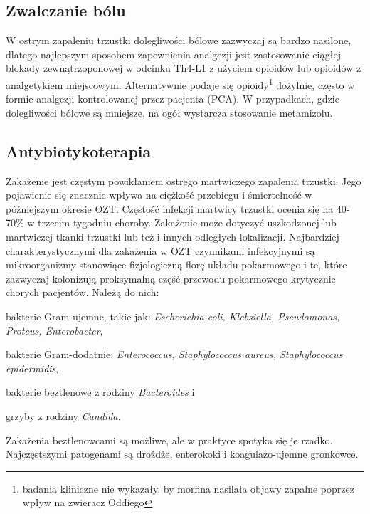 \documentclass[a4paper, 12pt]{report}
\begin{document}
\subsection{Zwalczanie bólu}

W ostrym zapaleniu trzustki dolegliwości bólowe zazwyczaj są bardzo
nasilone, dlatego najlepszym sposobem zapewnienia analgezji jest
zastosowanie ciągłej blokady zewnątrzoponowej w odcinku Th4-L1 z
użyciem opioidów lub opioidów z analgetykiem miejscowym. Alternatywnie
podaje się opioidy\footnote{badania kliniczne nie wykazały, by morfina
  nasilała objawy zapalne poprzez wpływ na zwieracz Oddiego} dożylnie,
często w formie analgezji kontrolowanej przez pacjenta (PCA). W
przypadkach, gdzie dolegliwości bólowe są mniejsze, na ogół wystarcza
stosowanie metamizolu.

\subsection{Antybiotykoterapia}

Zakażenie jest częstym powikłaniem ostrego martwiczego zapalenia
trzustki. Jego pojawienie się znacznie wpływa na ciężkość przebiegu i
śmiertelność w późniejszym okresie OZT. Częstość infekcji martwicy
trzustki ocenia się na 40-70\% w trzecim tygodniu choroby. Zakażenie
może dotyczyć uszkodzonej lub martwiczej tkanki trzustki lub też i
innych odległych lokalizacji. Najbardziej charakterystycznymi dla
zakażenia w OZT czynnikami infekcyjnymi są mikroorganizmy stanowiące
fizjologiczną florę układu pokarmowego i te, które zazwyczaj
kolonizują proksymalną część przewodu pokarmowego krytycznie chorych
pacjentów. Należą do nich:
\begin{inparaenum}
\item bakterie Gram-ujemne, takie jak: \textsl{Escherichia coli,
    Klebsiella, Pseudomonas, Proteus, Enterobacter},
\item bakterie Gram-dodatnie: \textsl{Enterococcus, Staphylococcus aureus,
    Staphylococcus epidermidis},
\item bakterie beztlenowe z rodziny \textsl{Bacteroides} i
\item grzyby z rodziny \textsl{Candida.}
\end{inparaenum}
Zakażenia beztlenowcami są możliwe, ale w praktyce spotyka się je
rzadko. Najczęstszymi patogenami są drożdże, enterokoki i
koagulazo-ujemne gronkowce. 
\end{document}
